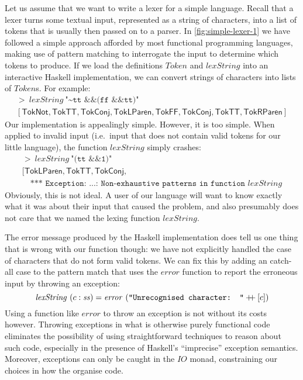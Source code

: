 \documentclass{jfp1}
\begin{document}
Let us assume that we want to write a lexer for a simple
language. Recall that a lexer turns some textual input, represented as
a string of characters, into a list of tokens that is usually then
passed on to a parser. In \autoref{fig:simple-lexer-1} we have
followed a simple approach afforded by most functional programming
languages, making use of pattern matching to interrogate the input to
determine which tokens to produce. If we load the definitions
$\mathit{Token}$ and $\mathit{lexString}$ into an interactive Haskell
implementation, we can convert strings of characters into lists of
$\mathit{Token}$s. For example:
\begin{displaymath}
  \begin{array}{l}
    >~\mathit{lexString}~\texttt{"\textasciitilde{}tt \&\& (ff \&\& tt)"} \\
    {}[\mathsf{TokNot}, \mathsf{TokTT}, \mathsf{TokConj}, \mathsf{TokLParen}, \mathsf{TokFF}, \mathsf{TokConj}, \mathsf{TokTT}, \mathsf{TokRParen}]
  \end{array}
\end{displaymath}
Our implementation is appealingly simple. However, it is too
simple. When applied to invalid input (i.e.~input that does not
contain valid tokens for our little language), the function
$\mathit{lexString}$ simply crashes:
\begin{displaymath}
  \begin{array}{l}
    >~\mathit{lexString}~\texttt{"(tt \&\& 1)"} \\
    {}[\mathsf{TokLParen}, \mathsf{TokTT}, \mathsf{TokConj}, \\
    \quad\texttt{*** Exception: ...: Non-exhaustive patterns in function }\mathit{lexString}
  \end{array}
\end{displaymath}
Obviously, this is not ideal. A user of our language will want to know
exactly what it was about their input that caused the problem, and
also presumably does not care that we named the lexing function
$\mathit{lexString}$.

The error message produced by the Haskell implementation does tell us
one thing that is wrong with our function though: we have not
explicitly handled the case of characters that do not form valid
tokens. We can fix this by adding an catch-all case to the pattern
match that uses the $\mathit{error}$ function to report the erroneous
input by throwing an exception:
\begin{displaymath}
  \mathit{lexString}~(c : \mathit{ss}) = \mathit{error}~(\texttt{"Unrecognised character: "} \mathbin{+\!\!+} [c])
\end{displaymath}
Using a function like $\mathit{error}$ to throw an exception is not
without its costs however. Throwing exceptions in what is otherwise
purely functional code eliminates the possibility of using
straightforward techniques to reason about such code, especially in
the presence of Haskell's ``imprecise'' exception semantics. Moreover,
exceptions can only be caught in the $\mathit{IO}$ monad, constraining
our choices in how the organise code.
\end{document}
